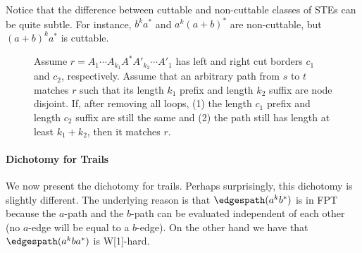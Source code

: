 \documentclass[a4paper,english]{lipics-v2016}
\theoremstyle{plain}
\begin{document}
Notice that the difference between cuttable and non-cuttable classes
of STEs can be quite subtle.
For instance, $b^k a^*$ and $a^k (a+b)^*$ are non-cuttable, but $(a+b)^k a^*$ is cuttable.

  
\begin{figure}
\centering
{}
\vspace{-.8cm}
\caption{Assume $r = A_1\cdots
  A_{k_1} A^* A'_{k_2} \cdots A'_1$ has left and right cut borders
  $c_1$ and $c_2$, respectively. Assume that an arbitrary path
  from $s$ to $t$ matches $r$ such that its length $k_1$ prefix and
  length $k_2$ suffix are node disjoint. If, after removing all loops, (1)
  the length $c_1$ prefix and length $c_2$ suffix are still the same and (2) the
  path still has length at least $k_1+k_2$, then it matches $r$.}
\label{fig:cuttable}
\end{figure}

\paragraph*{Dichotomy for Trails}
We now present the dichotomy for trails. Perhaps
surprisingly, this dichotomy is slightly different. The underlying
reason is that $\edgespath(a^kb^*)$ is in FPT because the $a$-path and
the $b$-path can be evaluated independent of each other (no $a$-edge
will be equal to a $b$-edge). On the other
hand we have that $\edgespath(a^kba^*)$ is
W[1]-hard. 
\end{document}
